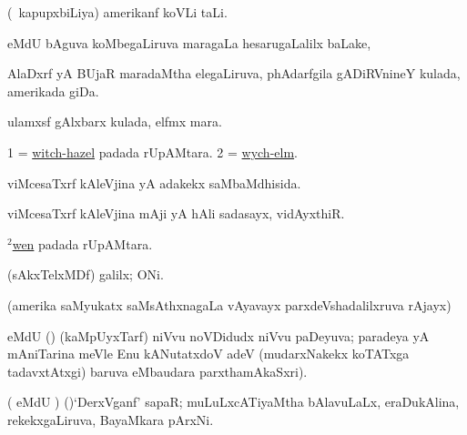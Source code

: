 \bentry
{} 
\gl{\nA}
\expl{}
\bmng
(\sA\ kapupxbiLiya) amerikanf koVLi taLi. 
\emng
\eentry

\bentry
{} 
\gl{\sapUpa}
\expl{}
\bmng
{} eMdU \parx \eng{)} bAguva koMbegaLiruva maragaLa hesarugaLalilx baLake, \udA\  
\emng
\eentry

\bentry
{} 
\gl{\nA}
\expl{}
\bmng
AlaDxrf yA BUjaR maradaMtha elegaLiruva, phAdarfgila gADiRVnineY kulada, amerikada giDa. 
\emng
\eentry

\bentry
{} 
\gl{\nA}
\expl{}
\bmng
ulamxsf gAlxbarx kulada, elfmx mara. 
\emng
\eentry

\bentry
{} 
\gl{\nA}
\expl{}
\bmng
\bnum
\num{1} = \hyperlink{witch-hazel}{witch-hazel} padada rUpAMtara. 
\num{2} = \hyperlink{wych-elm}{wych-elm}. 
\enum
\emng
\eentry

\bentry
{} 
\gl{\gu}
\expl{}
\bmng
viMcesaTxrf kAleVjina yA adakekx saMbaMdhisida. 
\emng
\eentry

\bentry
{} 
\gl{\nA}
\expl{}
\bmng
viMcesaTxrf kAleVjina mAji yA hAli sadasayx, vidAyxthiR. 
\emng
\eentry

\bentry
{} 
\gl{\nA}
\expl{}
\bmng
\hyperlink{wen(2)}{$^2$wen} padada rUpAMtara. 
\emng
\eentry

\bentry
{} 
\gl{\nA}
\expl{}
\bmng
(sAkxTelxMDf) galilx; ONi. 
\emng
\eentry

\bentry
{} 
\gl{\saMkiSx}
\expl{}
\bmng
(amerika saMyukatx saMsAthxnagaLa vAyavayx parxdeVshadalilxruva rAjayx)  
\emng
\eentry

\bentry
{} 
\gl{\gu}
\expl{}
\bmng
{} eMdU (\parx) (kaMpUyxTarf) niVvu noVDidudx niVvu paDeyuva; paradeya yA mAniTarina meVle Enu kANutatxdoV adeV (mudarxNakekx koTATxga tadavxtAtxgi) baruva  eMbaudara parxthamAkaSxri). 
\emng
\eentry

\bentry
{} 
\gl{\nA}
\expl{}
\bmng
( eMdU \parx) (\vaMlAM)`DerxVganf' sapaR; muLuLxcATiyaMtha bAlavuLaLx, eraDukAlina, rekekxgaLiruva, BayaMkara pArxNi. 
\emng
\eentry

%  

